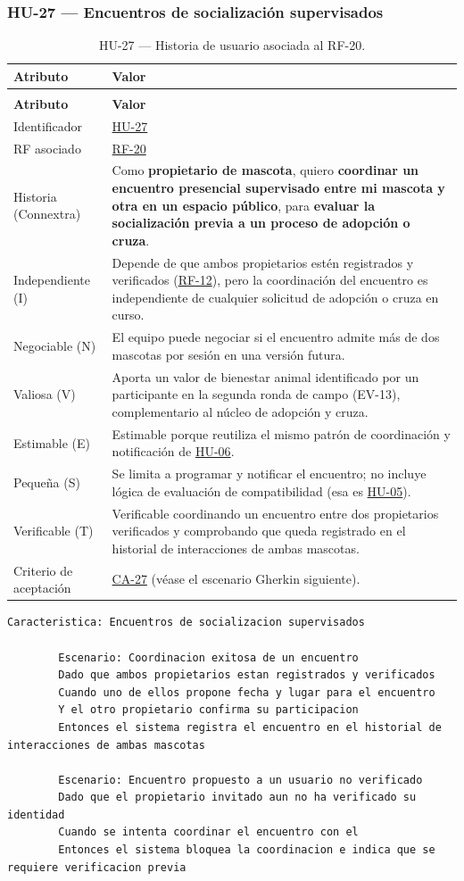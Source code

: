 \documentclass[journal,onecolumn]{IEEEtran}
\makeatletter
\newenvironment{atributos}[2]{%
	\small
	\begin{longtable}{@{}>{\raggedright\arraybackslash}p{4.2cm} >{\raggedright\arraybackslash}p{11.2cm}@{}}
		\caption{#2}\label{tab:#1}\\
		\toprule
		\textbf{Atributo} & \textbf{Valor} \\
		\midrule
		\endfirsthead
		\multicolumn{2}{@{}l}{\small\itshape (continuación)}\\
		\toprule
		\textbf{Atributo} & \textbf{Valor} \\
		\midrule
		\endhead
		\bottomrule
		\endlastfoot
	}{%
	\end{longtable}
	\normalsize
}
\makeatother
\begin{document}
	\subsubsection{HU-27 --- Encuentros de socialización supervisados}

	\begin{atributos}{HU-27}{HU-27 --- Historia de usuario asociada al RF-20.}
		Identificador & \hyperref[tab:HU-27]{HU-27} \\
		RF asociado & \hyperref[tab:RF-20]{RF-20} \\
		Historia (Connextra) & Como \textbf{propietario de mascota}, quiero \textbf{coordinar un encuentro presencial supervisado entre mi mascota y otra en un espacio público}, para \textbf{evaluar la socialización previa a un proceso de adopción o cruza}. \\
		Independiente (I) & Depende de que ambos propietarios estén registrados y verificados (\hyperref[tab:RF-12]{RF-12}), pero la coordinación del encuentro es independiente de cualquier solicitud de adopción o cruza en curso. \\
		Negociable (N) & El equipo puede negociar si el encuentro admite más de dos mascotas por sesión en una versión futura. \\
		Valiosa (V) & Aporta un valor de bienestar animal identificado por un participante en la segunda ronda de campo (EV-13), complementario al núcleo de adopción y cruza. \\
		Estimable (E) & Estimable porque reutiliza el mismo patrón de coordinación y notificación de \hyperref[tab:HU-06]{HU-06}. \\
		Pequeña (S) & Se limita a programar y notificar el encuentro; no incluye lógica de evaluación de compatibilidad (esa es \hyperref[tab:HU-05]{HU-05}). \\
		Verificable (T) & Verificable coordinando un encuentro entre dos propietarios verificados y comprobando que queda registrado en el historial de interacciones de ambas mascotas. \\
		Criterio de aceptación & \hyperref[lst:ca27]{CA-27} (véase el escenario Gherkin siguiente). \\
	\end{atributos}

	\begin{lstlisting}[style=gherkin,caption={CA-27 --- Escenario de aceptación de la historia HU-27.},label={lst:ca27}]
		Caracteristica: Encuentros de socializacion supervisados

		Escenario: Coordinacion exitosa de un encuentro
		Dado que ambos propietarios estan registrados y verificados
		Cuando uno de ellos propone fecha y lugar para el encuentro
		Y el otro propietario confirma su participacion
		Entonces el sistema registra el encuentro en el historial de interacciones de ambas mascotas

		Escenario: Encuentro propuesto a un usuario no verificado
		Dado que el propietario invitado aun no ha verificado su identidad
		Cuando se intenta coordinar el encuentro con el
		Entonces el sistema bloquea la coordinacion e indica que se requiere verificacion previa
	\end{lstlisting}
\end{document}
